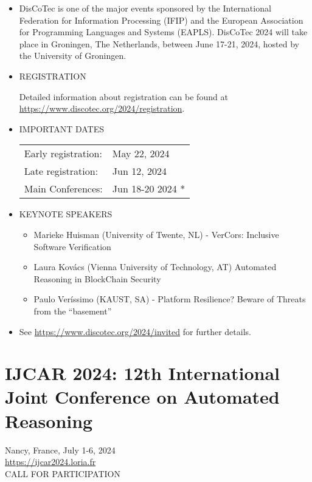 \documentclass[prodmode,acmtecs]{acmsmall} %
\begin{document}
\begin{itemize}\item   DisCoTec is one of the major events sponsored by the International Federation for Information Processing (IFIP) and the European Association for Programming Languages and Systems (EAPLS). DisCoTec 2024 will take place in Groningen, The Netherlands, between June 17-21, 2024, hosted by the University of Groningen.  
 
\item  REGISTRATION   
 
  Detailed information about registration can be found at \href{https://www.discotec.org/2024/registration}{https://www.discotec.org/2024/registration}. 
 
\item  IMPORTANT DATES  
 
\begin{tabulary}{\linewidth}{LL}Early registration:  & May 22, 2024 \\
Late registration:  & Jun 12, 2024 \\
Main Conferences:  & Jun 18-20 2024 * \\
\end{tabulary}
 
\item  KEYNOTE SPEAKERS 
 
\begin{itemize}\item  Marieke Huisman (University of Twente, NL) - VerCors: Inclusive Software Verification
\item  Laura Kovács (Vienna University of Technology, AT) Automated Reasoning in BlockChain Security
\item  Paulo Veríssimo (KAUST, SA) - Platform Resilience? Beware of Threats from the “basement”
\end{itemize} 
\item  See \href{https://www.discotec.org/2024/invited}{https://www.discotec.org/2024/invited} for further details. 
 
\end{itemize}\section{IJCAR 2024: 12th International Joint Conference on Automated Reasoning}\label{IJCAR2024}  Nancy, France, July 1-6, 2024\\ 
  \href{https://ijcar2024.loria.fr}{https://ijcar2024.loria.fr}\\ 
CALL FOR PARTICIPATION 
\end{document}

